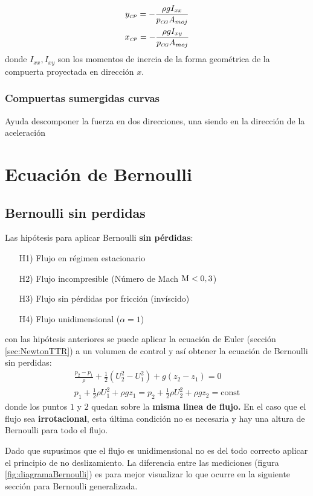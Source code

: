 \begin{gather}
y_{{\mbox{\tiny $C\!P$}}} = -\frac{\rho g I_{xx}}{p_{{\mbox{\tiny $C\!G$}}}A_{moj}} \\
x_{{\mbox{\tiny $C\!P$}}} = - \frac{\rho g I_{xy}}{p_{{\mbox{\tiny $C\!G$}}}A_{moj}}
\end{gather}
donde $I_{xx},I_{xy}$ son los momentos de inercia de la forma geométrica de la compuerta proyectada en dirección $x$.

\subsubsection*{Compuertas sumergidas curvas}
Ayuda descomponer la fuerza en dos direcciones, una siendo en la dirección de la aceleración

\section{Ecuación de Bernoulli}
\subsection{Bernoulli sin perdidas}
Las hipótesis para aplicar Bernoulli \textbf{sin pérdidas}:
\begin{itemize}
    \item[H1)] Flujo en régimen estacionario
    \item[H2)] Flujo incompresible (Número de Mach $\textrm{M}<0,3$)
    \item[H3)] Flujo sin pérdidas por fricción (invíscido)
    \item[H4)] Flujo unidimensional ($\alpha=1$)
\end{itemize}
con las hipótesis anteriores se puede aplicar la ecuación de Euler (sección \ref{sec:NewtonTTR}) a un volumen de control y así obtener la ecuación de Bernoulli sin perdidas:
\begin{gather*}
    \frac{p_2-p_1}{\rho}+\tfrac{1}{2}(U_2^2-U_1^2)+g(z_2-z_1)=0\\
    p_1+\tfrac{1}{2}\rho U_1^2+\rho gz_1=p_2+\tfrac{1}{2}\rho U_2^2+\rho g z_2=\textrm{const}
\end{gather*}
donde los puntos $1$ y $2$ quedan sobre la \textbf{misma linea de flujo.} En el caso que el flujo sea \textbf{irrotacional}, esta última condición no es necesaria y hay una altura de Bernoulli para todo el flujo.

Dado que supusimos que el flujo es unidimensional no es del todo correcto aplicar el principio de no deslizamiento. La diferencia entre las mediciones (figura \ref{fig:diagramaBernoulli}) es para mejor visualizar lo que ocurre en la siguiente sección para Bernoulli generalizada. 

